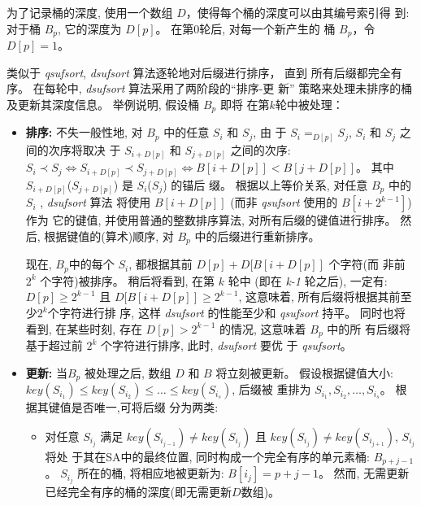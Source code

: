 为了记录桶的深度, 使用一个数组 $D$，使得每个桶的深度可以由其编号索引得
到: 对于桶 $B_p$, 它的深度为 $D[p]$。 在第0轮后, 对每一个新产生的
桶 $B_p$，令 $D[p] = 1$。

类似于 \emph{qsufsort}, \emph{dsufsort} 算法逐轮地对后缀进行排序， 直到
所有后缀都完全有序。 在每轮中, \emph{dsufsort} 算法采用了两阶段的“排序-更
新” 策略来处理未排序的桶及更新其深度信息。 举例说明, 假设桶 $B_p$ 即将
在第$k$轮中被处理：

\begin{itemize}
\item \textbf{排序:} 不失一般性地, 对 $B_p$ 中的任意 $S_i$ 和 $S_j$, 由
  于 $S_i =_{D[p]} S_j$, $S_i$ 和 $S_j$ 之间的次序将取决
  于 $S_{i+D[p]}$ 和 $S_{j+D[p]}$ 之间的次序:
  $S_i \prec S_j \iff S_{i+D[p]} \prec S_{j+D[p]} \iff B[i+D[p]] <
  B[j+D[p]]$。 其中 $S_{i+D[p]}$($S_{j+D[p]}$) 是 $S_i$($S_j$) 的锚后
  缀。 根据以上等价关系, 对任意 $B_p$ 中的 $S_i$ , \emph{dsufsort} 算法
  将使用 $B[i+D[p]]$ (而非 \emph{qsufsort} 使用的 $B[i+2^{k-1}]$) 作为
  它的键值, 并使用普通的整数排序算法, 对所有后缀的键值进行排序。 然后,
  根据键值的(算术)顺序, 对 $B_p$ 中的后缀进行重新排序。

  现在, $B_p$中的每个 $S_i$, 都根据其前 $D[p] + D[B[i+D[p]]$ 个字符(而
  非前 $2^k$ 个字符)被排序。 稍后将看到, 在第 $k$ 轮中 (即在 \emph{k-1}
  轮之后), 一定有: $D[p] \geq 2^{k-1}$ 且 $D[B[i+D[p]] \geq 2^{k-1}$,
  这意味着, 所有后缀将根据其前至少$2^k$个字符进行排
  序, 这样 \emph{dsufsort} 的性能至少和 \emph{qsufsort} 持平。 同时也将
  看到, 在某些时刻, 存在 $D[p] > 2^{k-1}$ 的情况, 这意味着 $B_p$ 中的所
  有后缀将基于超过前 $2^k$ 个字符进行排序, 此时, \emph{dsufsort} 要优
  于 \emph{qsufsort}。

\item \textbf{更新:} 当$B_p$ 被处理之后, 数组 $D$ 和 $B$ 将立刻被更新。
  假设根据键值大小:
  $key(S_{i_1}) \leq key(S_{i_2}) \leq \dots \leq key(S_{i_s})$, 后缀被
  重排为 $S_{i_1}, S_{i_2},\dots,S_{i_s}$。 根据其键值是否唯一,可将后缀
  分为两类:

\begin{itemize}

\item 对任意 $S_{i_j}$ 满足 $key(S_{i_{j-1}}) \neq
  key(S_{i_j})$ 且 $key(S_{i_j}) \neq key(S_{i_{j+1}})$, $S_{i_j}$ 将处
  于其在SA中的最终位置, 同时构成一个完全有序的单元素桶:
  $B_{p+j-1}$。 $S_{i_j}$ 所在的桶, 将相应地被更新为: $B[i_j] = p+j-1$。
  然而, 无需更新已经完全有序的桶的深度(即无需更新$D$数组)。


\end{itemize}
\end{itemize}
